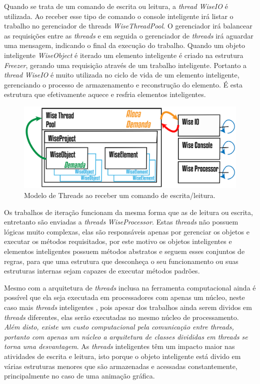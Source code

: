 Quando se trata de um comando de escrita ou leitura, a \textit{thread} \textit{WiseIO} é utilizada. Ao receber esse tipo de comando o console inteligente irá listar o trabalho no gerenciador de threads \textit{WiseThreadPool}. O gerenciador irá balancear as requisições entre as \textit{threads} e em seguida o gerenciador de \textit{threads} irá aguardar uma mensagem, indicando o final da execução do trabalho. Quando um objeto inteligente \textit{WiseObject} é iterado um elemento inteligente é criado na estrutura \textit{Freezer}, gerando uma requisição através de um trabalho inteligente. Portanto a \textit{thread} \textit{WiseIO} é muito utilizada no ciclo de vida de um elemento inteligente, gerenciando o processo de armazenamento e reconstrução do elemento. É esta estrutura que efetivamente aquece e resfria elementos inteligentes.

\begin{figure}[!htbp]
	\centering
	\includegraphics[width=\linewidth]{Figures/WiseThreadPoolHeating@16x.png}
	\caption{Modelo de Threads ao receber um comando de escrita/leitura.}
	\label{fig9:threads}
\end{figure}

Os trabalhos de iteração funcionam da mesma forma que as de leitura ou escrita, entretanto são enviadas a \textit{threads} \textit{WiseProcessor}. Estas \textit{threads} não possuem lógicas muito complexas, elas são responsáveis apenas por gerenciar os objetos e executar os métodos requisitados, por este motivo os objetos inteligentes e elementos inteligentes possuem métodos abstratos e seguem esses conjuntos de regras, para que uma estrutura que desconheça o seu funcionamento ou suas estruturas internas sejam capazes de executar métodos padrões. 

Mesmo com a arquitetura de \textit{threads} inclusa na ferramenta computacional ainda é possível que ela seja executada em processadores com apenas um núcleo, neste caso mais \textit{threads} inteligentes , pois apesar dos trabalhos ainda serem dividos em \textit{threads} diferentes, elas serão executadas no mesmo núcleo de processamento. \textit{Além disto, existe um custo computacional pela comunicação entre threads, portanto com apenas um núcleo a arquitetura de classes divididas em \textit{threads} se torna uma desvantagem}. As \textit{threads} inteligentes têm um impacto maior nas atividades de escrita e leitura, isto porque o objeto inteligente está divido em várias estruturas menores que são armazenadas e acessadas constantemente, principalmente no caso de uma animação gráfica.

